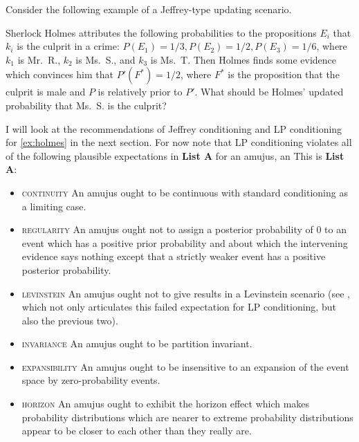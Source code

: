 \documentclass[12pt]{article}
\begin{document}
Consider the following example of a Jeffrey-type updating scenario.

\begin{quotex}
  \label{ex:holmes} Sherlock Holmes
  attributes the following probabilities to the propositions $E_{i}$
  that $k_{i}$ is the culprit in a crime:
  $P(E_{1})=1/3,P(E_{2})=1/2,P(E_{3})=1/6$, where $k_{1}$ is Mr.\ R.,
  $k_{2}$ is Ms.\ S., and $k_{3}$ is Ms.\ T. Then Holmes finds some
  evidence which convinces him that $P'(F^{*})=1/2$, where $F^{*}$ is
  the proposition that the culprit is male and $P$ is relatively prior
  to $P'$. What should be Holmes' updated probability that Ms.\ S. is
  the culprit?
\end{quotex}

I will look at the recommendations of Jeffrey conditioning and LP
conditioning for {\xample} \ref{ex:holmes} in the next section. For
now note that LP conditioning violates all of the following plausible
expectations in \textbf{List A}\label{page:listone} for an amujus, an
 This is \textbf{List A}:

\begin{itemize}
\item \textsc{continuity} An amujus ought to be continuous with
  standard conditioning as a limiting case.
\item \textsc{regularity} An amujus ought not to assign a posterior
  probability of $0$ to an event which has a positive prior
  probability and about which the intervening evidence says nothing
  except that a strictly weaker event has a positive posterior
  probability.
\item \textsc{levinstein} An amujus ought not to give  results in a Levinstein scenario (see
  , which not only articulates this failed
  expectation for LP conditioning, but also the previous two).
\item \textsc{invariance} An amujus ought to be partition invariant.
\item \textsc{expansibility} An amujus ought to be insensitive to an
  expansion of the event space by zero-probability events.
\item \textsc{horizon} An amujus ought to exhibit the horizon effect
  which makes probability distributions which are nearer to extreme
  probability distributions appear to be closer to each other than
  they really are.
\end{itemize}
\end{document}

